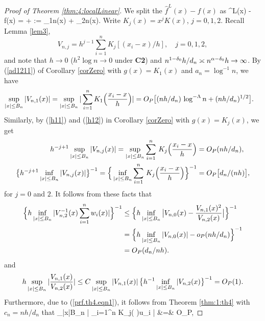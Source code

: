 \begin{proof}[Proof of Theorem \ref {thm:4:localLinear}]  We split the $\widehat{f}^L(x)-f(x)$ as
\be
{}^L(x) - f(x) =  +  := \Gamma_{1n}(x)  + \Gamma_{2n}(x). 
\ee
Write $K_j(x) = x^jK(x)$, $j = 0, 1, 2$. Recall Lemma \ref {lem3}, $$V_{n,j}=h^{j-1}
\sum_{i=1}^nK_j[(x_i-x)/h],\quad  j=0,1,2,$$
 and note that   $h\to 0$ ($h^2\log n\to 0$ under {\bf C2}) and $n^{1 - \delta_0} h / d_n \asymp n^{\alpha - \delta_0 } h \to \infty$.
  By (\ref{ad1211}) of Corollary \ref{corZero} with $g(x) = K_1(x)$ and $a_n = \log^{-1}n$, we have
\begin{align}
\sup_{|x| \le B_n} |V_{n,1}(x)| &= \sup_{|x| \le B_n} |\sum_{i = 1}^n K_1 \Big (\frac{x_i - x}{h} \Big )   |  = O_P\big [(nh / d_n)\, \log^{-\Lambda}n + (nh / d_n)^{1/2} \big ]. \nonumber
\end{align}
Similarly, by (\ref{h11}) and (\ref{h12}) in Corollary \ref{corZero} with $g(x) = K_j(x)$, we get
\begin{align}
 h^{-j + 1}\sup_{|x| \le B_n} |V_{n,j}(x)|  =\sup_{|x|\le B_n} \sum_{i=1}^{n}\, K_j\Big (\frac{x_{i}-x}{h}\Big) &= O_P(nh/ d_n), \la{prf.th4.eqn1}\\
\big \{ h^{-j + 1}\inf_{|x| \le B_n} |V_{n,j}(x)| \big \}^{-1} =\Big \{\inf_{|x|\le B_n} \sum_{i=1}^{n}\, K_j\Big (\frac{x_{i}-x}{h}\Big )\Big \}^{-1} &= O_P\big[ d_n / (nh) \big],\la{prf.th4.eqn2}
\end{align}
for $j = 0$ and $ 2$. It follows from these facts  that
\begin{align}
\Big\{h\inf_{|x| \le B_n} | V^{-1}_{n, 2}(x) \sum_{i = 1}^n w_i(x) |\Big\}^{-1} &\le \Big\{h \inf_{|x| \le B_n}  \big |V_{n, 0}(x) - \frac{V_{n, 1}(x)^2}{V_{n,2}(x)} \big | \Big\}^{-1} \no\\
&= \Big\{ h \inf_{|x| \le B_n}  |V_{n, 0}(x)| - o_P(nh/d_n) \Big\}^{-1} \no\\
&= O_P (d_n/nh).\la{prf.th4.eqn3}
\end{align}
and
\begin{align}
h\sup_{|x| \le B_n} | \frac{ V_{n, 1}(x)}{V_{n,2}(x)}|\le C \sup_{|x| \le B_n}|V_{n, 1}(x)| \,\big \{h^{-1} \inf_{|x|\le B_n}|V_{n, 2}(x) \big \}^{-1} = O_P(1).\la{prf.th4.eqn4}
\end{align}
Furthermore, due to (\ref{prf.th4.eqn1}), it follows from Theorem \ref{thm:1:th4} with $c_n=nh/ d_n$ that
\be
\sup_{|x|\le B_n} \Big | \sum_{i=1}^n K_j\Big ( \Big )u_i \Big | &=& O_P,

\end{proof}
